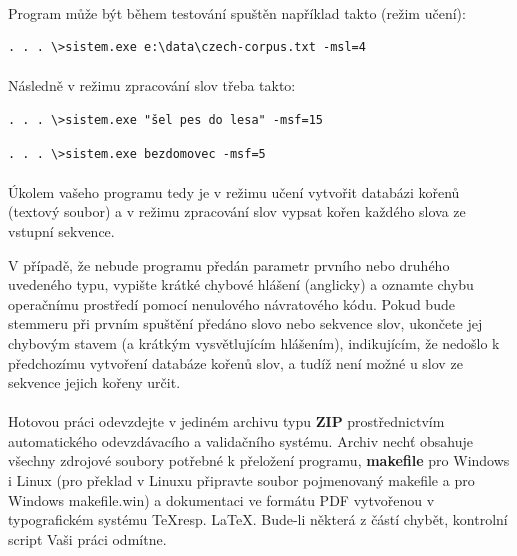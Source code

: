 ﻿\documentclass[12pt, a4paper]{article}
\begin{document}
\paragraph{}
Program může být během testování spuštěn například takto (režim učení):
\begin{verbatim}
. . . \>sistem.exe e:\data\czech-corpus.txt -msl=4
\end{verbatim}

\paragraph{}
Následně v režimu zpracování slov třeba takto:
\begin{verbatim}
. . . \>sistem.exe "šel pes do lesa" -msf=15
\end{verbatim}
\begin{verbatim}
. . . \>sistem.exe bezdomovec -msf=5
\end{verbatim}

\paragraph{}
Úkolem vašeho programu tedy je v režimu učení vytvořit databázi kořenů (textový soubor) a v režimu zpracování slov vypsat kořen každého slova ze vstupní sekvence. 

V případě, že nebude programu předán parametr prvního nebo druhého uvedeného typu, vypište krátké chybové hlášení (anglicky) a oznamte chybu operačnímu prostředí pomocí nenulového návratového kódu. Pokud bude stemmeru při prvním spuštění předáno slovo nebo sekvence slov, ukončete jej chybovým stavem (a krátkým vysvětlujícím hlášením), indikujícím, že nedošlo k předchozímu vytvoření databáze kořenů slov, a tudíž není možné u slov ze sekvence jejich kořeny určit.

\paragraph{}
Hotovou práci odevzdejte v jediném archivu typu \textbf{ZIP} prostřednictvím automatického odevzdávacího a validačního systému. Archiv nechť obsahuje všechny zdrojové soubory potřebné k přeložení programu, \textbf{makefile} pro Windows i Linux (pro překlad v Linuxu připravte soubor pojmenovaný makefile a pro Windows makefile.win) a dokumentaci ve formátu PDF vytvořenou v typografickém systému \TeX  resp. \LaTeX. Bude-li některá z částí chybět, kontrolní script Vaši práci odmítne.
\end{document}

